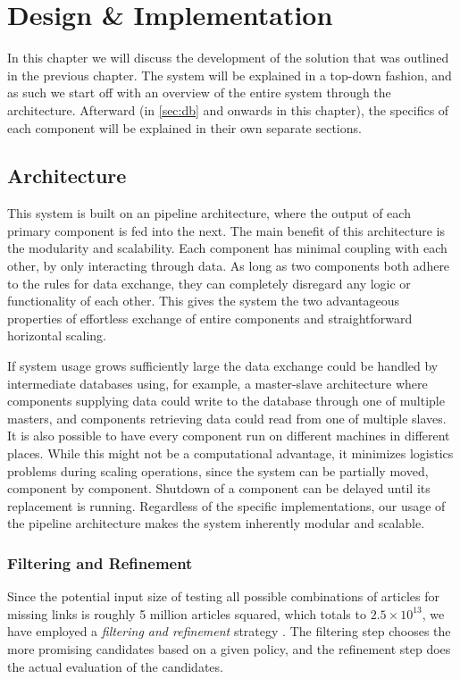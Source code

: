 \chapter{Design \& Implementation}\label{chap:design}
In this chapter we will discuss the development of the solution that was outlined in the previous chapter. The system will be explained in a top-down fashion, and as such we start off with an overview of the entire system through the architecture. Afterward (in \cref{sec:db} and onwards in this chapter), the specifics of each component will be explained in their own separate sections.

\section{Architecture}\label{sec:design_overview}
This system is built on an pipeline architecture, where the output of each primary component is fed into the next. The main benefit of this architecture is the modularity and scalability. Each component has minimal coupling with each other, by only interacting through data. As long as two components both adhere to the rules for data exchange, they can completely disregard any logic or functionality of each other. This gives the system the two advantageous properties of effortless exchange of entire components and straightforward horizontal scaling.

If system usage grows sufficiently large the data exchange could be handled by intermediate databases using, for example, a master-slave architecture where components supplying data could write to the database through one of multiple masters, and components retrieving data could read from one of multiple slaves. It is also possible to have every component run on different machines in different places. While this might not be a computational advantage, it minimizes logistics problems during scaling operations, since the system can be partially moved, component by component. Shutdown of a component can be delayed until its replacement is running. Regardless of the specific implementations, our usage of the pipeline architecture makes the system inherently modular and scalable.


\subsection{Filtering and Refinement}
Since the potential input size of testing all possible combinations of articles for missing links is roughly 5 million articles squared, which totals to $2.5 \times 10^{13}$, we have employed a \emph{filtering and refinement} strategy . The filtering step chooses the more promising candidates based on a given policy, and the refinement step does the actual evaluation of the candidates.

